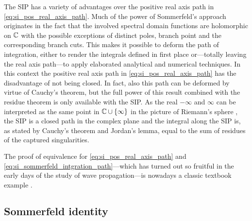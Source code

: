 The \ac{SIP} has a variety of advantages over the positive real axis path in
\eqref{eq:si_pos_real_axis_path}.
Much of the power of Sommerfeld's approach originates in the fact that the
involved spectral domain functions are holomorphic on $\mathbb{C}$ with the possible
exceptions of distinct poles, branch point and the corresponding branch cuts.
This makes it possible to deform the path of integration, either to render
the integrals defined in first place or---totally leaving the real axis
path---to apply elaborated analytical and numerical techniques.
In this context the positive real axis path in \eqref{eq:si_pos_real_axis_path}
has the disadvantage of not being closed.
In fact, also this path can be deformed by virtue of Cauchy's theorem, but
the full power of this result combined with the residue theorem is only
available with the \ac{SIP}.
As the real $-\infty$ and $\infty$ can be interpreted as the same point in
$\mathbb{C} \cup \left\{\infty\right\}$ in the picture of Riemann's sphere
\cite[p.~180]{Meyberg2006}, the \ac{SIP} is a closed path in the complex plane
and the integral along the \ac{SIP} is, as stated by Cauchy's theorem
and Jordan's lemma, equal to the sum of residues of the captured singularities.

The proof of equivalence for \eqref{eq:si_pos_real_axis_path} and
\eqref{eq:si_sommerfeld_intgration_path}---which has turned out so fruitful in
the early days of the study of wave propagation---is nowadays a classic textbook
example \cite[p.~203]{Sommerfeld1964}.







\subsection{Sommerfeld identity}



